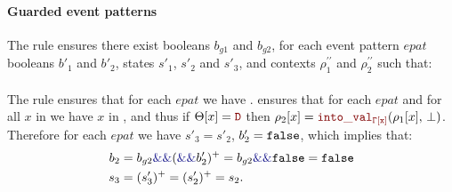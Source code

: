 \begin{skippableproof}
    \paragraph{Guarded event patterns}
    The rule  ensures there exist booleans
    $b_{g1}$ and $b_{g2}$, for each event pattern $epat$ booleans $b'_1$ and $b'_2$, states $s'_1$,
    $s'_2$ and $s'_3$, and contexts $\rho^{\prime\prime}_1$ and $\rho^{\prime\prime}_2$ such that:
    \\\noindent{}\\\noindent
    The rule  ensures that for each
    $epat$ we have .
     ensures that for each
    $epat$ and for all $x$ in  we have $x$ in , and thus if
    $\Theta[x] = \dType$ then $\rho_2[x] = \intoVal{\tyCtx[x]}{\rho_1[x]}{\bot}$.
    Therefore for each $epat$ we have $s'_3 = s'_2$, $b'_2 = \mathtt{{false}}$, which implies that:
    \begin{align*}
        b_2 & = b_{g2} \kwf{\&\&} (\kwf{\&\&} b'_2)^+ = b_{g2} \kwf{\&\&} \false = \false \\
        s_3 & = (s'_3)^+ = (s'_2)^+ = s_2.
    \end{align*}


\end{skippableproof}
